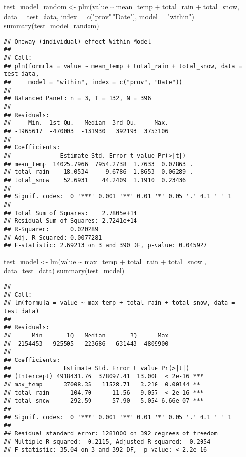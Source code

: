 \documentclass[
]{article}
\newenvironment{Shaded}{\begin{snugshade}}{\end{snugshade}}
\newcommand{\AttributeTok}[1]{\textcolor[rgb]{0.77,0.63,0.00}{#1}}
\newcommand{\FunctionTok}[1]{\textcolor[rgb]{0.00,0.00,0.00}{#1}}
\newcommand{\NormalTok}[1]{#1}
\newcommand{\OtherTok}[1]{\textcolor[rgb]{0.56,0.35,0.01}{#1}}
\newcommand{\SpecialCharTok}[1]{\textcolor[rgb]{0.00,0.00,0.00}{#1}}
\newcommand{\StringTok}[1]{\textcolor[rgb]{0.31,0.60,0.02}{#1}}
\begin{document}
\begin{Shaded}
\begin{Highlighting}[]
\NormalTok{test\_model\_random }\OtherTok{\textless{}{-}} \FunctionTok{plm}\NormalTok{(value }\SpecialCharTok{\textasciitilde{}}\NormalTok{ mean\_temp }\SpecialCharTok{+}\NormalTok{ total\_rain }\SpecialCharTok{+}\NormalTok{ total\_snow, }\AttributeTok{data =}\NormalTok{ test\_data, }\AttributeTok{index =} \FunctionTok{c}\NormalTok{(}\StringTok{"prov"}\NormalTok{,}\StringTok{"Date"}\NormalTok{), }\AttributeTok{model =} \StringTok{"within"}\NormalTok{)}
\FunctionTok{summary}\NormalTok{(test\_model\_random)}
\end{Highlighting}
\end{Shaded}

\begin{verbatim}
## Oneway (individual) effect Within Model
## 
## Call:
## plm(formula = value ~ mean_temp + total_rain + total_snow, data = test_data, 
##     model = "within", index = c("prov", "Date"))
## 
## Balanced Panel: n = 3, T = 132, N = 396
## 
## Residuals:
##     Min.  1st Qu.   Median  3rd Qu.     Max. 
## -1965617  -470003  -131930   392193  3753106 
## 
## Coefficients:
##              Estimate Std. Error t-value Pr(>|t|)  
## mean_temp  14025.7966  7954.2738  1.7633  0.07863 .
## total_rain    18.0534     9.6786  1.8653  0.06289 .
## total_snow    52.6931    44.2409  1.1910  0.23436  
## ---
## Signif. codes:  0 '***' 0.001 '**' 0.01 '*' 0.05 '.' 0.1 ' ' 1
## 
## Total Sum of Squares:    2.7805e+14
## Residual Sum of Squares: 2.7241e+14
## R-Squared:      0.020289
## Adj. R-Squared: 0.0077281
## F-statistic: 2.69213 on 3 and 390 DF, p-value: 0.045927
\end{verbatim}

\begin{Shaded}
\begin{Highlighting}[]
\NormalTok{test\_model }\OtherTok{\textless{}{-}} \FunctionTok{lm}\NormalTok{(value }\SpecialCharTok{\textasciitilde{}}\NormalTok{ max\_temp }\SpecialCharTok{+}\NormalTok{ total\_rain }\SpecialCharTok{+}\NormalTok{ total\_snow , }\AttributeTok{data=}\NormalTok{test\_data)}
\FunctionTok{summary}\NormalTok{(test\_model)}
\end{Highlighting}
\end{Shaded}

\begin{verbatim}
## 
## Call:
## lm(formula = value ~ max_temp + total_rain + total_snow, data = test_data)
## 
## Residuals:
##      Min       1Q   Median       3Q      Max 
## -2154453  -925505  -223686   631443  4809900 
## 
## Coefficients:
##               Estimate Std. Error t value Pr(>|t|)    
## (Intercept) 4918431.76  378097.41  13.008  < 2e-16 ***
## max_temp     -37008.35   11528.71  -3.210  0.00144 ** 
## total_rain     -104.70      11.56  -9.057  < 2e-16 ***
## total_snow     -292.59      57.90  -5.054 6.66e-07 ***
## ---
## Signif. codes:  0 '***' 0.001 '**' 0.01 '*' 0.05 '.' 0.1 ' ' 1
## 
## Residual standard error: 1281000 on 392 degrees of freedom
## Multiple R-squared:  0.2115, Adjusted R-squared:  0.2054 
## F-statistic: 35.04 on 3 and 392 DF,  p-value: < 2.2e-16
\end{verbatim}
\end{document}
